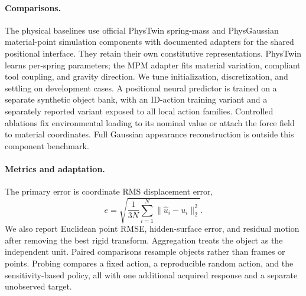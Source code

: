 \paragraph{Comparisons.}
The physical baselines use official PhysTwin spring-mass and PhysGaussian material-point simulation components with documented adapters for the shared positional interface. They retain their own constitutive representations. PhysTwin learns per-spring parameters; the MPM adapter fits material variation, compliant tool coupling, and gravity direction. We tune initialization, discretization, and settling on development cases. A positional neural predictor is trained on a separate synthetic object bank, with an ID-action training variant and a separately reported variant exposed to all local action families. Controlled ablations fix environmental loading to its nominal value or attach the force field to material coordinates. Full Gaussian appearance reconstruction is outside this component benchmark.

\paragraph{Metrics and adaptation.}
The primary error is coordinate RMS displacement error,
\begin{equation}
 e=\sqrt{\frac{1}{3N}\sum_{i=1}^N\|\hat u_i-u_i\|_2^2}.
\end{equation}
We also report Euclidean point RMSE, hidden-surface error, and residual motion after removing the best rigid transform. Aggregation treats the object as the independent unit. Paired comparisons resample objects rather than frames or points. Probing compares a fixed action, a reproducible random action, and the sensitivity-based policy, all with one additional acquired response and a separate unobserved target.
